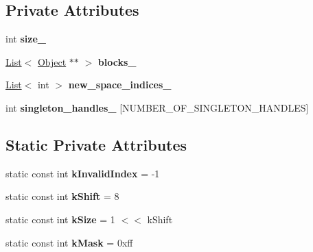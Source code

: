 \subsection*{Private Attributes}
\begin{DoxyCompactItemize}
\item 
int {\bfseries size\+\_\+}\hypertarget{classv8_1_1internal_1_1_eternal_handles_a97d7d5e3978e7b4657dc403f474172aa}{}\label{classv8_1_1internal_1_1_eternal_handles_a97d7d5e3978e7b4657dc403f474172aa}

\item 
\hyperlink{classv8_1_1internal_1_1_list}{List}$<$ \hyperlink{classv8_1_1internal_1_1_object}{Object} $\ast$$\ast$ $>$ {\bfseries blocks\+\_\+}\hypertarget{classv8_1_1internal_1_1_eternal_handles_a35f9777e99738208d61df638aa1c18ad}{}\label{classv8_1_1internal_1_1_eternal_handles_a35f9777e99738208d61df638aa1c18ad}

\item 
\hyperlink{classv8_1_1internal_1_1_list}{List}$<$ int $>$ {\bfseries new\+\_\+space\+\_\+indices\+\_\+}\hypertarget{classv8_1_1internal_1_1_eternal_handles_a3ec8fb6c6627e26dba03c5dbd058b978}{}\label{classv8_1_1internal_1_1_eternal_handles_a3ec8fb6c6627e26dba03c5dbd058b978}

\item 
int {\bfseries singleton\+\_\+handles\+\_\+} \mbox{[}N\+U\+M\+B\+E\+R\+\_\+\+O\+F\+\_\+\+S\+I\+N\+G\+L\+E\+T\+O\+N\+\_\+\+H\+A\+N\+D\+L\+ES\mbox{]}\hypertarget{classv8_1_1internal_1_1_eternal_handles_adabd605a850cd144e13cfe07d6d6dcd0}{}\label{classv8_1_1internal_1_1_eternal_handles_adabd605a850cd144e13cfe07d6d6dcd0}

\end{DoxyCompactItemize}
\subsection*{Static Private Attributes}
\begin{DoxyCompactItemize}
\item 
static const int {\bfseries k\+Invalid\+Index} = -\/1\hypertarget{classv8_1_1internal_1_1_eternal_handles_a7f8ce6e7e4490411e45674155d9103fb}{}\label{classv8_1_1internal_1_1_eternal_handles_a7f8ce6e7e4490411e45674155d9103fb}

\item 
static const int {\bfseries k\+Shift} = 8\hypertarget{classv8_1_1internal_1_1_eternal_handles_aae98f23bfb0e050d83ce27cf83aa95da}{}\label{classv8_1_1internal_1_1_eternal_handles_aae98f23bfb0e050d83ce27cf83aa95da}

\item 
static const int {\bfseries k\+Size} = 1 $<$$<$ k\+Shift\hypertarget{classv8_1_1internal_1_1_eternal_handles_a3dcfe83c35f6068570a72edca76056d6}{}\label{classv8_1_1internal_1_1_eternal_handles_a3dcfe83c35f6068570a72edca76056d6}

\item 
static const int {\bfseries k\+Mask} = 0xff\hypertarget{classv8_1_1internal_1_1_eternal_handles_a632548611350fa612097422be53e0d28}{}\label{classv8_1_1internal_1_1_eternal_handles_a632548611350fa612097422be53e0d28}

\end{DoxyCompactItemize}


